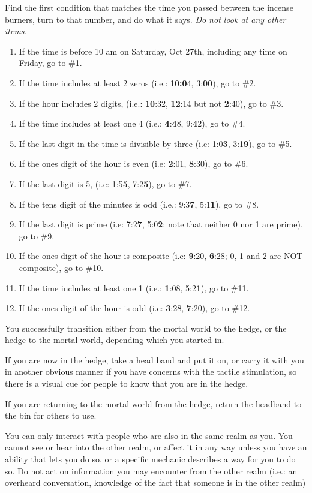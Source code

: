 \documentclass[green]{gl2018}
\begin{document}
Find the first condition that matches the time you passed between the incense burners, turn to that number, and do what it says. {\em Do not look at any other items.}
\begin{enumerate}
\item If the time is before 10 am on Saturday, Oct 27th, including any time on Friday, go to \#1.
\item 
If the time includes at least 2 zeros (i.e.: 1\textbf{0:0}4, 3:\textbf{00}), go to \#2.
\item If the hour includes 2 digits, (i.e.: \textbf{10}:32, \textbf{12}:14 but not \textbf{2}:40), go to \#3.
\item 
If the time includes at least one 4 (i.e.: \textbf{4}:\textbf{4}8, 9:\textbf{4}2), go to \#4.
\item 
If the last digit in the time is divisible by three (i.e: 1:0\textbf{3}, 3:1\textbf{9}), go to \#5.
\item
If the ones digit of the hour is even (i.e: \textbf{2}:01, \textbf{8}:30), go to \#6.
\item
If the last digit is 5, (i.e: 1:5\textbf{5}, 7:2\textbf{5}), go to \#7. 
\item If the tens digit of the minutes is odd (i.e.: 9:3\textbf{7}, 5:1\textbf{1}), go to \#8.
\item
If the last digit is prime (i.e: 7:2\textbf{7}, 5:0\textbf{2}; note that neither 0 nor 1 are prime), go to \#9.
\item If the ones digit of the hour is composite (i.e: \textbf{9}:20, \textbf{6}:28;  0, 1 and 2 are NOT composite), go to \#10.
\item If the time includes at least one 1 (i.e.: {\bf 1}:08, 5:2{\bf 1}), go to \#11.
\item If the ones digit of the hour is odd (i.e: {\bf 3}:28, {\bf 7}:20), go to \#12.
\end{enumerate}
\pagebreak
\begin{sect}{1}
You successfully transition either from the mortal world to the hedge, or the hedge to the mortal world, depending which you started in.

If you are now in the hedge, take a head band and put it on, or carry it with you in another obvious manner if you have concerns with the tactile stimulation, so there is a visual cue for people to know that you are in the hedge.

If you are returning to the mortal world from the hedge, return the headband to the bin for others to use.

You can only interact with people who are also in the same realm as you. You cannot see or hear into the other realm, or affect it in any way unless you have an ability that lets you do so, or a specific mechanic describes a way for you to do so. Do not act on information you may encounter from the other realm (i.e.: an overheard conversation, knowledge of the fact that someone is in the other realm)
\end{sect}
\end{document}
